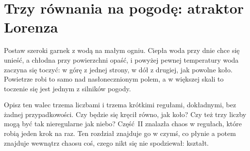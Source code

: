 
\chapter{Trzy równania na pogodę: atraktor Lorenza}
\label{ch:lorenz}

\noindent
Postaw szeroki garnek z wodą na małym ogniu. Ciepła woda przy dnie chce się
unieść, a chłodna przy powierzchni opaść, i powyżej pewnej temperatury woda
zaczyna się toczyć: w górę z jednej strony, w dół z drugiej, jak powolne
koło. Powietrze robi to samo nad nasłonecznionym polem, a w większej skali to
toczenie się jest jednym z silników pogody.

Opisz ten walec trzema liczbami i trzema krótkimi regułami, dokładnymi, bez
żadnej przypadkowości. Czy będzie się kręcił równo, jak koło? Czy też trzy
liczby mogą być tak nieregularne jak niebo? Część~II znalazła chaos w
regułach, które robią jeden krok na raz. Ten rozdział znajduje go w czymś,
co płynie \dash{} a potem znajduje wewnątrz chaosu coś, czego nikt się nie
spodziewał: kształt.

\begin{outcomes}
\end{outcomes}

